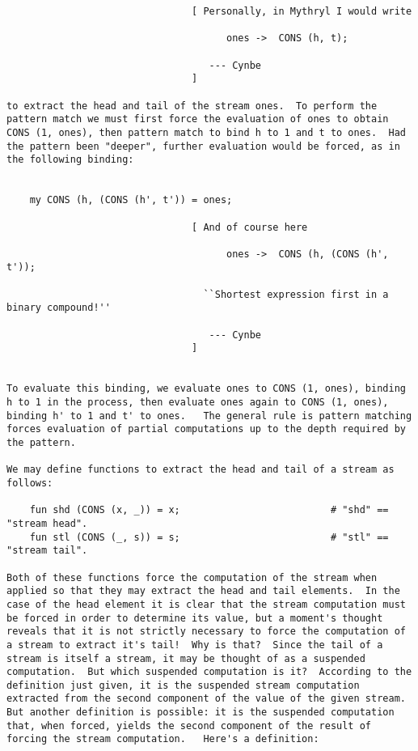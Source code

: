 \begin{verbatim}
                                [ Personally, in Mythryl I would write 
 
                                      ones ->  CONS (h, t); 
 
                                   --- Cynbe 
                                ] 
 
to extract the head and tail of the stream ones.  To perform the 
pattern match we must first force the evaluation of ones to obtain 
CONS (1, ones), then pattern match to bind h to 1 and t to ones.  Had 
the pattern been "deeper", further evaluation would be forced, as in 
the following binding: 
 
 
    my CONS (h, (CONS (h', t')) = ones; 
 
                                [ And of course here 
 
                                      ones ->  CONS (h, (CONS (h', t')); 
 
                                  ``Shortest expression first in a binary compound!'' 
 
                                   --- Cynbe 
                                ] 
 
 
To evaluate this binding, we evaluate ones to CONS (1, ones), binding 
h to 1 in the process, then evaluate ones again to CONS (1, ones), 
binding h' to 1 and t' to ones.   The general rule is pattern matching 
forces evaluation of partial computations up to the depth required by 
the pattern. 
 
We may define functions to extract the head and tail of a stream as 
follows: 
 
    fun shd (CONS (x, _)) = x;                          # "shd" == "stream head". 
    fun stl (CONS (_, s)) = s;                          # "stl" == "stream tail". 
 
Both of these functions force the computation of the stream when 
applied so that they may extract the head and tail elements.  In the 
case of the head element it is clear that the stream computation must 
be forced in order to determine its value, but a moment's thought 
reveals that it is not strictly necessary to force the computation of 
a stream to extract it's tail!  Why is that?  Since the tail of a 
stream is itself a stream, it may be thought of as a suspended 
computation.  But which suspended computation is it?  According to the 
definition just given, it is the suspended stream computation 
extracted from the second component of the value of the given stream. 
But another definition is possible: it is the suspended computation 
that, when forced, yields the second component of the result of 
forcing the stream computation.   Here's a definition: 
 

\end{verbatim}
